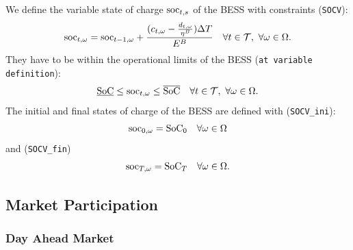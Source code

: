 We define the variable state of charge $\text{soc}_{t, s}$ of the BESS with constraints (\verb|SOCV|): 
\begin{equation} \label{EQ:SOCV}
	\text{soc}_{t, \omega} = \text{soc}_{t - 1, \omega} + \frac{(c_{t, \omega} - \frac{d_{t, \omega}}{\eta^B})\Delta T}{E^B} \quad \forall t \in \mathcal{T}, \ \forall \omega \in \Omega. 
\end{equation} 
They have to be within the operational limits of the BESS (\verb|at variable definition|):
\begin{equation} \label{EQ:socVOperLimits}
	\underline{\text{SoC}} \leq \text{soc}_{t, \omega} \leq \overline{\text{SoC}} \quad \forall t \in \mathcal{T}, \ \forall \omega \in \Omega.
\end{equation}
The initial and final states of charge of the BESS are defined with (\verb|SOCV_ini|):
\begin{equation} \label{EQ:SOCV_ini}
	\text{soc}_{0, \omega} = \text{SoC}_0 \quad \forall \omega \in \Omega
\end{equation}
and (\verb|SOCV_fin|)
\begin{equation} \label{EQ:SOCV_fin}
	\text{soc}_{T, \omega} = \text{SoC}_T \quad \forall \omega \in \Omega.
\end{equation}


\subsection{Market Participation}
\label{SEC:MarketParticipation}

\subsubsection{Day Ahead Market}

